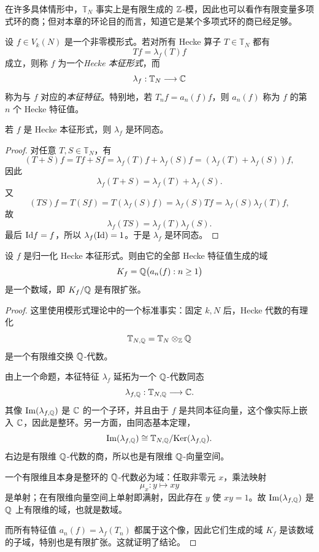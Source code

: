 \begin{remark}
在许多具体情形中，$\mathbb{T}_N$ 事实上是有限生成的 $\mathbb{Z}$-模，因此也可以看作有限变量多项式环的商；但对本章的环论目的而言，知道它是某个多项式环的商已经足够。
\end{remark}

\begin{definition}
设 $f\in V_k(N)$ 是一个非零模形式。若对所有 Hecke 算子 $T\in\mathbb{T}_N$ 都有
\[
Tf=\lambda_f(T)f
\]
成立，则称 $f$ 为一个\emph{Hecke 本征形式}，而
\[
\lambda_f:\mathbb{T}_N\longrightarrow \mathbb{C}
\]
称为与 $f$ 对应的\emph{本征特征}。特别地，若 $T_n f=a_n(f)f$，则 $a_n(f)$ 称为 $f$ 的第 $n$ 个 Hecke 特征值。
\end{definition}

\begin{proposition}
若 $f$ 是 Hecke 本征形式，则 $\lambda_f$ 是环同态。
\end{proposition}

\begin{proof}
对任意 $T,S\in\mathbb{T}_N$，有
\[
(T+S)f=Tf+Sf=\lambda_f(T)f+\lambda_f(S)f=(\lambda_f(T)+\lambda_f(S))f,
\]
因此
\[
\lambda_f(T+S)=\lambda_f(T)+\lambda_f(S).
\]
又
\[
(TS)f=T(Sf)=T(\lambda_f(S)f)=\lambda_f(S)Tf=\lambda_f(S)\lambda_f(T)f,
\]
故
\[
\lambda_f(TS)=\lambda_f(T)\lambda_f(S).
\]
最后 $\mathrm{Id} f=f$，所以 $\lambda_f(\mathrm{Id})=1$。于是 $\lambda_f$ 是环同态。
\end{proof}

\begin{theorem}
设 $f$ 是归一化 Hecke 本征形式。则由它的全部 Hecke 特征值生成的域
\[
K_f=\mathbb{Q}\bigl(a_n(f):n\ge 1\bigr)
\]
是一个数域，即 $K_f/\mathbb{Q}$ 是有限扩张。
\end{theorem}

\begin{proof}
这里使用模形式理论中的一个标准事实：固定 $k,N$ 后，Hecke 代数的有理化
\[
\mathbb{T}_{N,\mathbb{Q}}=\mathbb{T}_N\otimes_{\mathbb{Z}} \mathbb{Q}
\]
是一个有限维交换 $\mathbb{Q}$-代数。

由上一个命题，本征特征 $\lambda_f$ 延拓为一个 $\mathbb{Q}$-代数同态
\[
\lambda_{f,\mathbb{Q}}:\mathbb{T}_{N,\mathbb{Q}}\longrightarrow \mathbb{C}.
\]
其像 $\mathrm{Im}(\lambda_{f,\mathbb{Q}})$ 是 $\mathbb{C}$ 的一个子环，并且由于 $f$ 是共同本征向量，这个像实际上嵌入 $\mathbb{C}$，因此是整环。另一方面，由同态基本定理，
\[
\mathrm{Im}(\lambda_{f,\mathbb{Q}})\cong \mathbb{T}_{N,\mathbb{Q}}/\mathrm{Ker}(\lambda_{f,\mathbb{Q}}).
\]
右边是有限维 $\mathbb{Q}$-代数的商，所以也是有限维 $\mathbb{Q}$-向量空间。

一个有限维且本身是整环的 $\mathbb{Q}$-代数必为域：任取非零元 $x$，乘法映射
\[
\mu_x:y\mapsto xy
\]
是单射；在有限维向量空间上单射即满射，因此存在 $y$ 使 $xy=1$。故 $\mathrm{Im}(\lambda_{f,\mathbb{Q}})$ 是 $\mathbb{Q}$ 上有限维的域，也就是数域。

而所有特征值 $a_n(f)=\lambda_f(T_n)$ 都属于这个像，因此它们生成的域 $K_f$ 是该数域的子域，特别也是有限扩张。这就证明了结论。
\end{proof}

